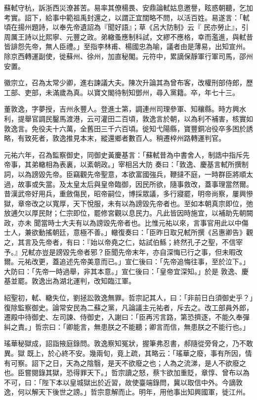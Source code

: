 \begin{pinyinscope}
 蘇軾守杭，訴浙西災潦甚苦。易率其僚楊畏、安鼎論軾姑息邀譽，眩惑朝聽，乞加考實。詔下，給事中範祖禹封還之，以謂正宜闊略不問，以活百姓。易遂言：「軾頃在揚州題詩，以奉先帝遺詔為『聞好語』；草《呂大防制》云『
 民亦勞止』，引周厲王詩以比熙寧、元豐之政。弟轍蚤應制科試，文繆不應格，幸而濫進，與軾昔皆誹怨先帝，無人臣禮。」至指李林甫、楊國忠為喻，議者由是薄易，出知宣州。除京西轉運副使，徙蘇州、徐州，加直秘閣。元符中，累謫保靜軍行軍司馬，邵州安置。



 徽宗立，召為太常少卿，進右諫議大夫。陳次升論其為曾布客，改權刑部侍郎，歷工部、吏部，未滿歲為真。以寶文閣待制知鄧州，尋入黨籍。卒，年七十三。



 董敦逸，字夢授，吉州永豐人。登進士第，調連州司理參軍、知穰縣。時方興水利，提舉官調民鑿馬渡港，云可灌田二百頃，敦逸言於朝，以為利不補害，核實如敦逸言。免役夫十六萬，全舊田三千六百頃。徙知弋陽縣，寶豐銅冶役卒多困於誘略，有致死者，敦逸推見本末，縱還鄉者數百人。稍遷梓州路轉運判官。



 元祐六年，召為監察御史，同御史黃慶基言：「蘇軾昔為中書舍人，制誥中指斥先帝事，其弟轍相為表裏，以紊朝政。」宰相呂大防
 奏曰：「敦逸、慶基言軾所撰制詞，以為謗毀先帝。臣竊觀先帝聖意，本欲富國強兵，鞭撻不庭，一時群臣將順太過，故事或失當。及太皇太后與皇帝臨御，因民所欲，隨事救改，蓋事理當然爾。昔漢武帝好用兵，重斂傷民，昭帝嗣位，博採眾議，多行寢罷，明帝尚察，屢興慘獄，章帝改之以寬厚，天下悅服，未有以為謗毀先帝者也。至如本朝真宗即位，弛放逋欠以厚民財；仁宗即位，罷修宮觀以息民力。凡此皆因時施宜，以補助先朝闕政，亦未
 聞當時士大夫有以為謗毀先帝者也。比惟元祐以來，言事官用此以中傷士人，兼欲動搖朝廷，意極不善。」轍復奏曰：「臣昨日取兄軾所撰《呂惠卿告》觀之，其言及先帝者，有曰：『始以帝堯之仁，姑試伯鯀；終然孔子之聖，不信宰予。』兄軾亦豈是謗毀先帝者邪？臣聞先帝末年，亦自深悔已行之事，但未暇改爾。元祐改更，蓋追述先帝美意而已。」宣仁後曰：「先帝追悔往事，至於泣下。」大防曰：「先帝一時過舉，非其本意。」宣仁後曰：「皇帝宜深知。」於是
 敦逸、慶基並罷。敦逸出為湖北運判，改知臨江軍。



 紹聖初，軾、轍失位，劉拯訟敦逸無罪。哲宗記其人，曰：「非前日白須御史乎？」復除監察御史。論常安民為二蘇之黨，凡論議主元祐者，斥去之。改工部員外郎，遷殿中待御史、左司諫、侍御史，入謝曰：「臣再污言路，第恐擠逐，不能久奉彈糾之責。」哲宗曰：「卿能言，無患朕之不能聽；卿言而信，無患朕之不能行也。」



 瑤華秘獄成，詔詣掖庭錄問。敦逸察知冤狀，握筆弗忍書，郝隨從旁脅之，乃不敢異。獄
 既上，於心終不安。幾兩旬，竟上疏，其略云：「瑤華之廢，事有所因，情有可察。詔下之日，天為之陰翳，是天不欲廢之也；人為之流涕，是人不欲廢之也。臣嘗閱錄其獄，恐得罪天下。」哲宗讀之怒，蔡卞欲加重貶，章惇、曾布以為不可，曰：「陛下本以皇城獄出於近習，故使臺端錄問，冀以取信中外。今謫敦逸，何以解天下後世之謗。」哲宗意解而止。明年，用他事出知興國軍，徙江州。




\end{pinyinscope}
